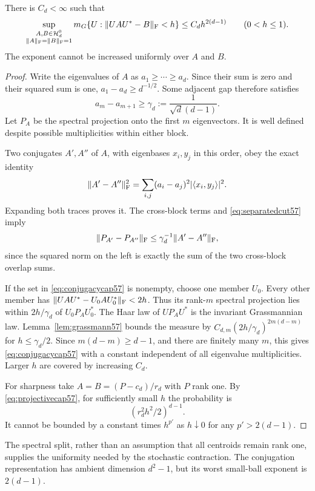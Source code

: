 \begin{lemma}\label{lem:conjugacysmall57}
There is $C_d<\infty$ such that
\begin{equation}\label{eq:conjugacycap57}
 \sup_{\substack{A,B\in\mathcal H_d^0\\\|A\|_{\rm F}=\|B\|_{\rm F}=1}}
 m_G\{U:\|UAU^*-B\|_{\rm F}<h\}
                 \le C_d h^{2(d-1)}\qquad(0<h\le1).
\end{equation}
The exponent cannot be increased uniformly over $A$ and $B$.
\end{lemma}
\begin{proof}
Write the eigenvalues of $A$ as $a_1\ge\cdots\ge a_d$. Since their sum is zero and their squared sum is one, $a_1-a_d\ge d^{-1/2}$. Some adjacent gap therefore satisfies
\begin{equation}\label{eq:separatedcut57}
 a_m-a_{m+1}\ge\gamma_d:=\frac1{\sqrt d(d-1)}.
\end{equation}
Let $P_A$ be the spectral projection onto the first $m$ eigenvectors. It is well defined despite possible multiplicities within either block.

Two conjugates $A',A''$ of $A$, with eigenbases $x_i,y_j$ in this order, obey the exact identity
\begin{equation}\label{eq:spectralidentity57}
 \|A'-A''\|_{\rm F}^2
       =\sum_{i,j}(a_i-a_j)^2|\langle x_i,y_j\rangle|^2.
\end{equation}
Expanding both traces proves it. The cross-block terms and \eqref{eq:separatedcut57} imply
\begin{equation}\label{eq:projectorbound57}
 \|P_{A'}-P_{A''}\|_{\rm F}
                    \le\gamma_d^{-1}\|A'-A''\|_{\rm F},
\end{equation}
since the squared norm on the left is exactly the sum of the two cross-block overlap sums.

If the set in \eqref{eq:conjugacycap57} is nonempty, choose one member $U_0$. Every other member has $\|UAU^*-U_0AU_0^*\|_{\rm F}<2h$. Thus its rank-$m$ spectral projection lies within $2h/\gamma_d$ of $U_0P_AU_0^*$. The Haar law of $UP_AU^*$ is the invariant Grassmannian law. Lemma~\ref{lem:grassmann57} bounds the measure by
$C_{d,m}(2h/\gamma_d)^{2m(d-m)}$ for $h\le\gamma_d/2$. Since $m(d-m)\ge d-1$, and there are finitely many $m$, this gives \eqref{eq:conjugacycap57} with a constant independent of all eigenvalue multiplicities. Larger $h$ are covered by increasing $C_d$.

For sharpness take $A=B=(P-c_d)/r_d$ with $P$ rank one. By \eqref{eq:projectivecap57}, for sufficiently small $h$ the probability is
\[
                    (r_d^2h^2/2)^{d-1}.
\]
It cannot be bounded by a constant times $h^{p'}$ as $h\downarrow0$ for any $p'>2(d-1)$.
\end{proof}
The spectral split, rather than an assumption that all centroids remain rank one, supplies the uniformity needed by the stochastic contraction. The conjugation representation has ambient dimension $d^2-1$, but its worst small-ball exponent is $2(d-1)$.

